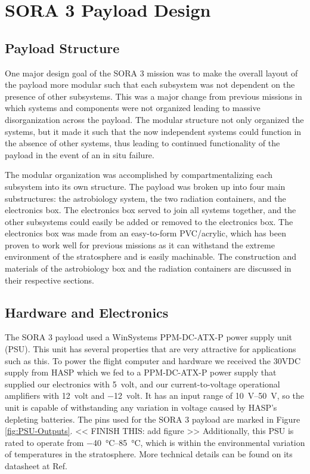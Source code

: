 \section{SORA 3 Payload Design}
\label{sec:Design}

\subsection{Payload Structure}
One major design goal of the SORA 3 mission was to make the overall layout of the payload more modular such that each subsystem was not dependent on the presence of other subsystems.
This was a major change from previous missions in which systems and components were not organized leading to massive disorganization across the payload.
The modular structure not only organized the systems, but it made it such that the now independent systems could function in the absence of other systems, thus leading to continued functionality of the payload in the event of an in situ failure.

The modular organization was accomplished by compartmentalizing each subsystem into its own structure.
The payload was broken up into four main substructures: the astrobiology system, the two radiation containers, and the electronics box.
The electronics box served to join all systems together, and the other subsystems could easily be added or removed to the electronics box.
The electronics box was made from an easy-to-form PVC/acrylic, which has been proven to work well for previous missions as it can withstand the extreme environment of the stratosphere and is easily machinable.
The construction and materials of the astrobiology box and the radiation containers are discussed in their respective sections.



\subsection{Hardware and Electronics}
The SORA 3 payload used a WinSystems PPM-DC-ATX-P power supply unit (PSU).
This unit has several properties that are very attractive for applications such as this. 
To power the flight computer and hardware we received the 30VDC supply from HASP which we fed to a PPM-DC-ATX-P power supply that supplied our electronics with \SI{+5}{volt}, and our current-to-voltage operational amplifiers with \SI{+12}{volt} and \SI{-12}{volt}.
It has an input range of \SIrange{10}{50}{\volt}, so the unit is capable of withstanding any variation in voltage caused by HASP's depleting batteries.
The pins used for the SORA 3 payload are marked in Figure \ref{fig:PSU-Outputs}. << FINISH THIS: add figure >>
Additionally, this PSU is rated to operate from \SIrange{-40}{85}{\celsius}, which is within the environmental variation of temperatures in the stratosphere.
More technical details can be found on its datasheet at Ref. \cite{WinSystems-PSU}

